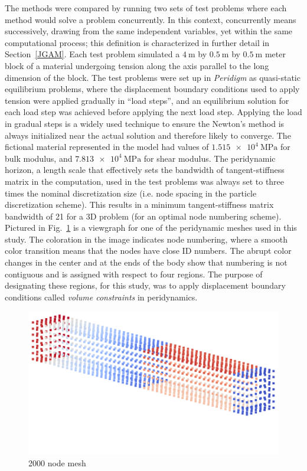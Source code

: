 \documentclass[preprint,12pt]{elsarticle}
\begin{document}
The methods were compared by running two sets of test problems where each
method would solve a problem concurrently. In this context, concurrently means
successively, drawing from the same independent variables, yet within the same
computational process; this definition is characterized in further detail in
Section~\ref{JGAM}. Each test problem simulated a $\SI{4}{\meter}$ by
$\SI{0.5}{\meter}$ by $\SI{0.5}{\meter}$ meter block of a material undergoing
tension along the axis parallel to the long dimension of the block. The test
problems were set up in \emph{Peridigm} as quasi-static equilibrium problems,
where the displacement boundary conditions used to apply tension were applied
gradually in ``load steps'', and an equilibrium solution for each load step was
achieved before applying the next load step. Applying the load
in gradual steps is a widely used technique to ensure the Newton's method is
always initialized near the actual solution and therefore likely to converge.
The fictional material represented in the model had values of
$\SI{1.515e4}{\mega\pascal}$ for bulk modulus, and $\SI{7.813e4}{\mega\pascal}$
for shear modulus. The peridynamic horizon, a length scale that effectively
sets the bandwidth of tangent-stiffness matrix in the computation, used in the test
problems was always set to three times the nominal discretization size (i.e.
node spacing in the particle discretization scheme). This results in a minimum
tangent-stiffness matrix bandwidth of 21 for a 3D problem (for an optimal node
numbering scheme). Pictured in Fig.~\ref{fig:SCMesh} is a viewgraph for one of
the peridynamic meshes used in this study. The coloration in the image
indicates node numbering, where a smooth color transition means that the nodes
have close ID numbers. The abrupt color changes in the center and at the ends
of the body show that numbering is not contiguous and is assigned with respect to four regions. The purpose of designating
these regions, for this study, was to apply displacement boundary
conditions called \emph{volume constraints} in peridynamics. 

\begin{figure}[tbp] \centering \includegraphics[width=1.0\textwidth]{./figs/mesh2000_replacement.png}
\caption{2000 node mesh} \label{fig:SCMesh}
\end{figure}
\end{document}

